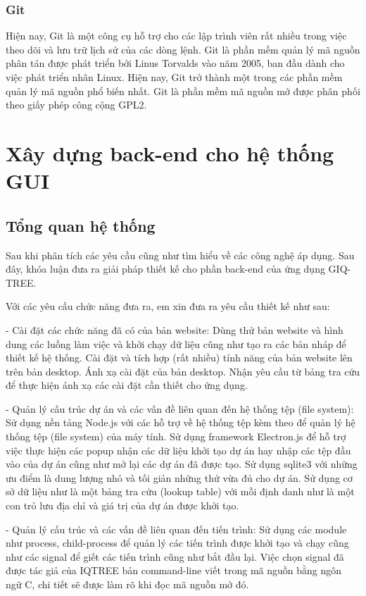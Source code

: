 \documentclass[12pt]{report}
\begin{document}
\subsection{Git}
Hiện nay, Git là một công cụ hỗ trợ cho các lập trình viên rất nhiều trong việc theo dõi và lưu trữ lịch sử của các dòng lệnh. Git là phần mềm quản lý mã nguồn phân tán được phát triển bởi Linus Torvalds vào năm 2005, ban đầu dành cho việc phát triển nhân Linux. Hiện nay, Git trở thành một trong các phần mềm quản lý mã nguồn phổ biến nhất. Git là phần mềm mã nguồn mở được phân phối theo giấy phép công cộng GPL2.

\newpage	
\chapter{Xây dựng back-end cho hệ thống GUI}
\label{chap:chapter4}
\section{Tổng quan hệ thống}
Sau khi phân tích các yêu cầu cũng như tìm hiểu về các công nghệ áp dụng. Sau đây, khóa luận đưa ra giải pháp thiết kế cho phần back-end của ứng dụng GIQ-TREE.

Với các yêu cầu chức năng đưa ra, em xin đưa ra yêu cầu thiết kế như sau:

- Cài đặt các chức năng đã có của bản website: Dùng thử bản website và hình dung các luồng làm việc và khởi chạy dữ liệu cũng như tạo ra các bản nháp để thiết kế hệ thống. Cài đặt và tích hợp (rất nhiều) tính năng của bản website lên trên bản desktop. Ánh xạ cài đặt của bản desktop. Nhận yêu cầu từ bảng tra cứu để thực hiện ánh xạ các cài đặt cần thiết cho ứng dụng.

- Quản lý cấu trúc dự án và các vấn đề liên quan đến hệ thống tệp (file system): Sử dụng nền tảng Node.js với các hỗ trợ về hệ thống tệp kèm theo để quản lý hệ thống tệp (file system) của máy tính. Sử dụng framework Electron.js để hỗ trợ việc thực hiện các popup nhận các dữ liệu khởi tạo dự án hay nhập các tệp đầu vào của dự án cũng như mở lại các dự án đã được tạo. Sử dụng sqlite3 với những ưu điểm là dung lượng nhỏ và tối giản những thứ vừa đủ cho dự án. Sử dụng cơ sở dữ liệu như là một bảng tra cứu (lookup table) với mỗi định danh như là một con trỏ lưu địa chỉ và giá trị của dự án được khởi tạo.

- Quản lý cấu trúc và các vấn đề liên quan đến tiến trình: Sử dụng các module như process, child-process để quản lý các tiến trình được khởi tạo và chạy cũng như các signal để giết các tiến trình cũng như bắt đầu lại. Việc chọn signal đã được tác giả của IQTREE bản command-line viết trong mã nguồn bằng ngôn ngữ C, chi tiết sẽ được làm rõ khi đọc mã nguồn mở đó.
\end{document}
